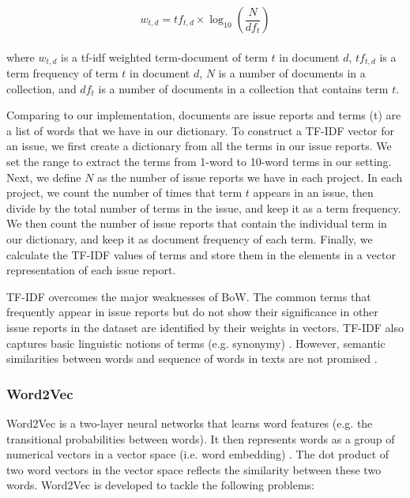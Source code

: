 \begin{equation*}
	w_{t,d} = tf_{t,d} \times \log_{10} \left(\frac{N}{df_t}\right)
\end{equation*}
\\
where $w_{t,d}$ is a tf-idf weighted term-document of term $t$ in document $d$, $tf_{t,d}$ is a term frequency of term $t$ in document $d$, $N$ is a number of documents in a collection, and $df_t$ is a number of documents in a collection that contains term $t$.

Comparing to our implementation, documents are issue reports and terms (t) are a list of words that we have in our dictionary. To construct a TF-IDF vector for an issue, we first create a dictionary from all the terms in our issue reports. We set the range to extract the terms from 1-word to 10-word terms in our setting. Next, we define $N$ as the number of issue reports we have in each project. In each project, we count the number of times that term $t$ appears in an issue, then divide by the total number of terms in the issue, and keep it as a term frequency. We then count the number of issue reports that contain the individual term in our dictionary, and keep it as document frequency of each term. Finally, we calculate the TF-IDF values of terms and store them in the elements in a vector representation of each issue report.

TF-IDF overcomes the major weaknesses of BoW. The common terms that frequently appear in issue reports but do not show their significance in other issue reports in the dataset are identified by their weights in vectors. TF-IDF also captures basic linguistic notions of terms (e.g. synonymy) \cite{blei2003latent}. However, semantic similarities between words and sequence of words in texts are not promised \cite{Kowsari2019}.


\subsubsection{Word2Vec} \label{subsec:W2V}

Word2Vec is a two-layer neural networks that learns word features (e.g. the transitional probabilities between words). It then represents words as a group of numerical vectors in a vector space (i.e. word embedding) \cite{Mikolov2013}. The dot product of two word vectors in the vector space reflects the similarity between these two words. Word2Vec is developed to tackle the following problems:

